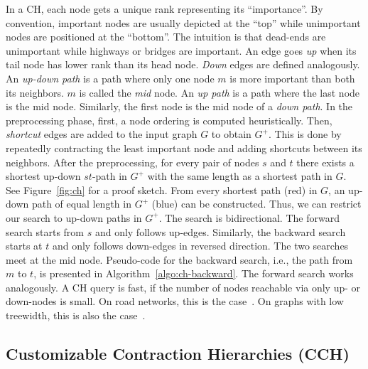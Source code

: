 \documentclass[manuscript,review]{acmart}
\begin{document}
In a CH, each node gets a unique rank representing its ``importance''.
By convention, important nodes are usually depicted at the ``top'' while unimportant nodes are positioned at the ``bottom''.
The intuition is that dead-ends are unimportant while highways or bridges are important.
An edge goes \emph{up} when its tail node has lower rank than its head node.
\emph{Down} edges are defined analogously.
An \emph{up-down path} is a path where only one node $m$ is more important than both its neighbors.
$m$ is called the \emph{mid} node.
An \emph{up path} is a path where the last node is the mid node.
Similarly, the first node is the mid node of a \emph{down path}.
%
In the preprocessing phase, first, a node ordering is computed heuristically.
Then, \emph{shortcut} edges are added to the input graph $G$ to obtain $G^+$.
This is done by repeatedly contracting the least important node and adding shortcuts between its neighbors.
After the preprocessing, for every pair of nodes $s$ and $t$ there exists a shortest up-down $st$-path in $G^+$ with the same length as a shortest path in $G$.
See Figure~\ref{fig:ch} for a proof sketch.
From every shortest path (red) in $G$, an up-down path of equal length in $G^+$ (blue) can be constructed.
Thus, we can restrict our search to up-down paths in $G^+$.
The search is bidirectional.
The forward search starts from $s$ and only follows up-edges.
Similarly, the backward search starts at $t$ and only follows down-edges in reversed direction.
The two searches meet at the mid node.
Pseudo-code for the backward search, i.e., the path from $m$ to $t$, is presented in Algorithm~\ref{algo:ch-backward}.
The forward search works analogously.
%
A CH query is fast, if the number of nodes reachable via only up- or down-nodes is small.
On road networks, this is the case~\cite{gssv-erlrn-12,dgpw-crprn-13}.
On graphs with low treewidth, this is also the case~\cite{dsw-cch-15,hs-gbpo-18}.


\subsection{Customizable Contraction Hierarchies (CCH)}
\end{document}
